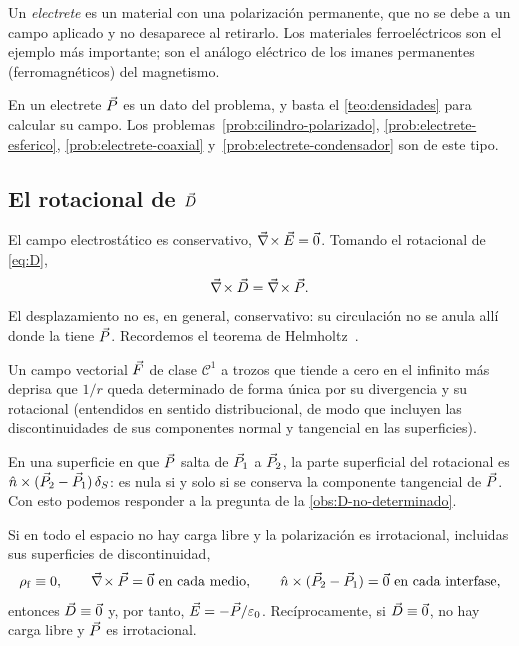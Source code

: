 \begin{definicion}[Electrete]\label{def:electrete}
Un \emph{electrete} es un material con una polarización permanente, que no se debe a un campo aplicado y no
desaparece al retirarlo. Los materiales ferroeléctricos son el ejemplo más importante; son el análogo eléctrico
de los imanes permanentes (ferromagnéticos) del magnetismo.
\end{definicion}

En un electrete $\vec P$ es un dato del problema, y basta el \cref{teo:densidades} para calcular su campo. Los
problemas~\ref{prob:cilindro-polarizado}, \ref{prob:electrete-esferico}, \ref{prob:electrete-coaxial}
y~\ref{prob:electrete-condensador} son de este tipo.

\subsection{El rotacional de $\vec D$}\label{sec:rot-D}

El campo electrostático es conservativo, $\vec\nabla\!\times\vec E=\vec 0$. Tomando el rotacional de \eqref{eq:D},
\begin{equation}\label{eq:rot-D}
  \vec\nabla\!\times\vec D=\vec\nabla\!\times\vec P .
\end{equation}
El desplazamiento no es, en general, conservativo: su circulación no se anula allí donde la tiene $\vec P$.
Recordemos el teorema de Helmholtz~\cite{T0}.

\begin{lema}\label{lem:helmholtz}
Un campo vectorial $\vec F$ de clase $\mathcal C^1$ a trozos que tiende a cero en el infinito más deprisa que $1/r$
queda determinado de forma única por su divergencia y su rotacional (entendidos en sentido distribucional,
de modo que incluyen las discontinuidades de sus componentes normal y tangencial en las superficies).
\end{lema}

En una superficie en que $\vec P$ salta de $\vec P_1$ a $\vec P_2$, la parte superficial del rotacional es
$\hat n\times(\vec P_2-\vec P_1)\,\delta_S$: es nula si y solo si se conserva la componente tangencial de $\vec P$. Con esto
podemos responder a la pregunta de la \cref{obs:D-no-determinado}.

\begin{proposicion}\label{prop:D-nulo}
Si en todo el espacio no hay carga libre y la polarización es irrotacional, incluidas sus superficies de
discontinuidad,
\[
  \rho_{\mathrm f}\equiv0,\qquad \vec\nabla\!\times\vec P=\vec 0\ \text{en cada medio},\qquad \hat n\times(\vec P_2-\vec P_1)=\vec 0\ \text{en cada interfase},
\]
entonces $\vec D\equiv\vec 0$ y, por tanto, $\vec E=-\vec P/\varepsilon_0$. Recíprocamente, si $\vec D\equiv\vec 0$, no hay carga libre y $\vec P$
es irrotacional.
\end{proposicion}


